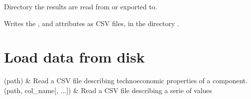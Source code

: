 \documentclass[letterpaper,10pt,english]{sphinxmanual}
\begin{document}
\begin{fulllineitems}
\begin{fulllineitems}
\label{\detokenize{generated/tamos.data_IO.ResultsBatch:tamos.data_IO.ResultsBatch.working_dir}}
\pysigstartsignatures
{}
\pysigstopsignatures
\sphinxAtStartPar
Directory the results are read from or exported to.

\end{fulllineitems}


\begin{fulllineitems}
\label{\detokenize{generated/tamos.data_IO.ResultsBatch:tamos.data_IO.ResultsBatch.write_all}}
\pysigstartsignatures
{}
\pysigstopsignatures
\sphinxAtStartPar
Writes the ,  and  attributes as CSV files, in the directory .

\end{fulllineitems}


\end{fulllineitems}



\section{Load data from disk}
\label{\detokenize{data_IO:load-data-from-disk}}

\begin{savenotes}\sphinxattablestart
\centering
\begin{tabulary}{\linewidth}[t]{}
\hline

\sphinxAtStartPar
{\hyperref[\detokenize{generated/tamos.data_IO.read_properties:tamos.data_IO.read_properties}]{}}(path)
&
\sphinxAtStartPar
Read a CSV file describing techno\sphinxhyphen{}economic properties of a component.
\\
\hline
\sphinxAtStartPar
{\hyperref[\detokenize{generated/tamos.data_IO.read_data:tamos.data_IO.read_data}]{}}(path, col\_name{[}, ...{]})
&
\sphinxAtStartPar
Read a CSV file describing a serie of values
\\
\hline
\end{tabulary}
\par
\sphinxattableend\end{savenotes}
\end{document}
